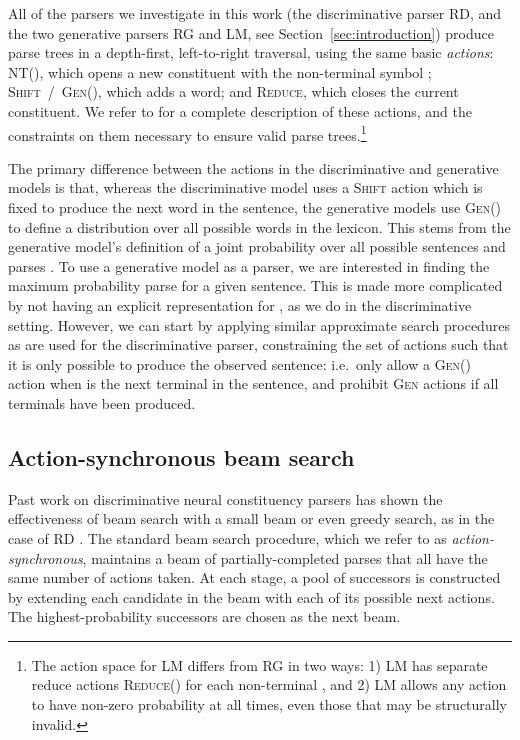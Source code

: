 \documentclass[11pt,a4paper]{article}
\begin{document}
All of the parsers we investigate in this work (the discriminative parser RD, and the two generative parsers RG and LM, see Section~\ref{sec:introduction}) produce parse trees in a depth-first, left-to-right traversal, using the same basic \emph{actions}: 
\textsc{NT()}, which opens a new constituent with the non-terminal symbol ;
\mbox{\textsc{Shift / Gen()}}, which adds a word;
and \textsc{Reduce}, which closes the current constituent. 
We refer to \citet{dyer2016recurrent} for a complete description of these actions, and the constraints on them necessary to ensure valid parse trees.\footnote{The action space for LM differs from RG in two ways: 1) LM has separate reduce actions \textsc{Reduce()} for each non-terminal , and 2) LM allows any action to have non-zero probability at all times, even those that may be structurally invalid. 
}

The primary difference between the actions in the discriminative and generative models is that, whereas the discriminative model uses a \textsc{Shift} action which is fixed to produce the next word in the sentence, the generative models use \textsc{Gen()} to define a distribution over all possible words  in the lexicon. This stems from the generative model's definition of a joint probability  over all possible sentences  and parses . To use a generative model as a parser, we are interested in finding the maximum probability parse for a given sentence. This is made more complicated by not having an explicit representation for , as we do in the discriminative setting. However, we can start by applying similar approximate search procedures as are used for the discriminative parser, constraining the set of actions such that it is only possible to produce the observed sentence: i.e.\ only allow a \textsc{Gen()} action when  is the next terminal in the sentence, and prohibit \textsc{Gen} actions if all terminals have been produced.

\subsection{Action-synchronous beam search}
\label{sec:action-level-beam}
Past work on discriminative neural constituency parsers has shown the effectiveness of beam search with a small beam \cite{vinyals2015grammar} or even greedy search, as in the case of RD \cite{dyer2016recurrent}. The standard beam search procedure, which we refer to as \emph{action-synchronous}, maintains a beam of  partially-completed parses that all have the same number of actions taken. At each stage, a pool of successors is constructed by extending each candidate in the beam with each of its possible next actions. The  highest-probability successors are chosen as the next beam.
\end{document}
